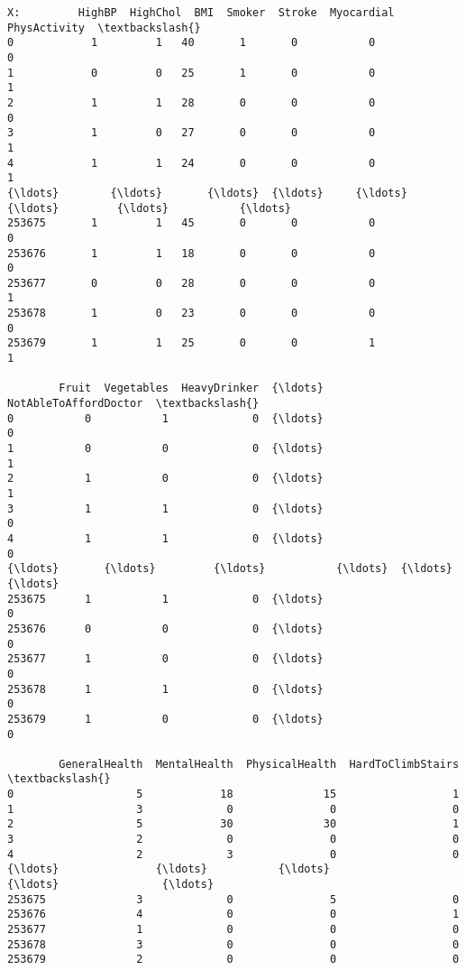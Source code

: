 \documentclass[11pt]{article}
\begin{document}
    \begin{Verbatim}[commandchars=\\\{\}]
X:         HighBP  HighChol  BMI  Smoker  Stroke  Myocardial  PhysActivity  \textbackslash{}
0            1         1   40       1       0           0             0
1            0         0   25       1       0           0             1
2            1         1   28       0       0           0             0
3            1         0   27       0       0           0             1
4            1         1   24       0       0           0             1
{\ldots}        {\ldots}       {\ldots}  {\ldots}     {\ldots}     {\ldots}         {\ldots}           {\ldots}
253675       1         1   45       0       0           0             0
253676       1         1   18       0       0           0             0
253677       0         0   28       0       0           0             1
253678       1         0   23       0       0           0             0
253679       1         1   25       0       0           1             1

        Fruit  Vegetables  HeavyDrinker  {\ldots}  NotAbleToAffordDoctor  \textbackslash{}
0           0           1             0  {\ldots}                      0
1           0           0             0  {\ldots}                      1
2           1           0             0  {\ldots}                      1
3           1           1             0  {\ldots}                      0
4           1           1             0  {\ldots}                      0
{\ldots}       {\ldots}         {\ldots}           {\ldots}  {\ldots}                    {\ldots}
253675      1           1             0  {\ldots}                      0
253676      0           0             0  {\ldots}                      0
253677      1           0             0  {\ldots}                      0
253678      1           1             0  {\ldots}                      0
253679      1           0             0  {\ldots}                      0

        GeneralHealth  MentalHealth  PhysicalHealth  HardToClimbStairs  \textbackslash{}
0                   5            18              15                  1
1                   3             0               0                  0
2                   5            30              30                  1
3                   2             0               0                  0
4                   2             3               0                  0
{\ldots}               {\ldots}           {\ldots}             {\ldots}                {\ldots}
253675              3             0               5                  0
253676              4             0               0                  1
253677              1             0               0                  0
253678              3             0               0                  0
253679              2             0               0                  0


\end{Verbatim}
\end{document}
